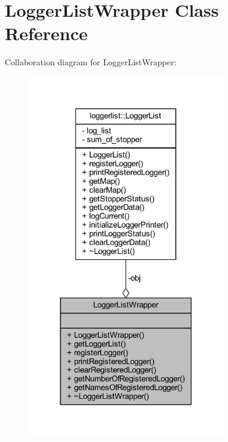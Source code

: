 \hypertarget{class_logger_list_wrapper}{}\section{Logger\+List\+Wrapper Class Reference}
\label{class_logger_list_wrapper}


Collaboration diagram for Logger\+List\+Wrapper\+:\nopagebreak
\begin{figure}[H]
\begin{center}
\leavevmode
\includegraphics[width=244pt]{class_logger_list_wrapper__coll__graph}
\end{center}
\end{figure}
